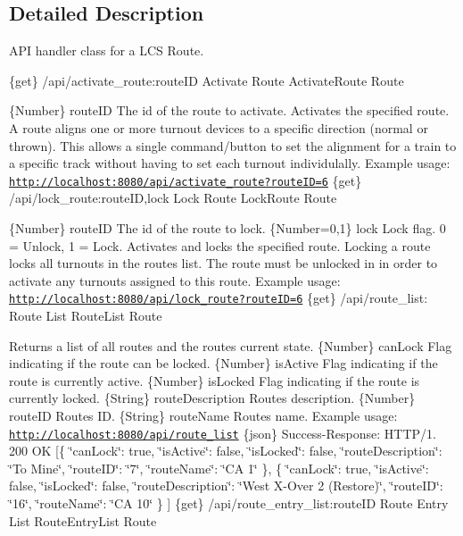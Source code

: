 \subsection{Detailed Description}
A\+PI handler class for a L\+CS Route. 

\{get\} /api/activate\+\_\+route\+:route\+ID Activate Route  Activate\+Route  Route

\{Number\} route\+ID The id of the route to activate.  Activates the specified route. A route aligns one or more turnout devices to a specific direction (normal or thrown). This allows a single command/button to set the alignment for a train to a specific track without having to set each turnout individulally.  Example usage\+: \href{http://localhost:8080/api/activate_route?routeID=6}{\tt http\+://localhost\+:8080/api/activate\+\_\+route?route\+I\+D=6}  \{get\} /api/lock\+\_\+route\+:route\+ID,lock Lock Route  Lock\+Route  Route

\{Number\} route\+ID The id of the route to lock.  \{Number=0,1\} lock Lock flag. 0 = Unlock, 1 = Lock.  Activates and locks the specified route. Locking a route locks all turnouts in the route\textquotesingle{}s list. The route must be unlocked in in order to activate any turnouts assigned to this route.  Example usage\+: \href{http://localhost:8080/api/lock_route?routeID=6}{\tt http\+://localhost\+:8080/api/lock\+\_\+route?route\+I\+D=6}  \{get\} /api/route\+\_\+list\+: Route List  Route\+List  Route

Returns a list of all routes and the routes current state.  \{Number\} can\+Lock Flag indicating if the route can be locked.  \{Number\} is\+Active Flag indicating if the route is currently active.  \{Number\} is\+Locked Flag indicating if the route is currently locked.  \{String\} route\+Description Route\textquotesingle{}s description.  \{Number\} route\+ID Route\textquotesingle{}s ID.  \{String\} route\+Name Route\textquotesingle{}s name.  Example usage\+: \href{http://localhost:8080/api/route_list}{\tt http\+://localhost\+:8080/api/route\+\_\+list}  \{json\} Success-\/\+Response\+: H\+T\+T\+P/1. 200 OK \mbox{[}\{ \char`\"{}can\+Lock\char`\"{}\+: true, \char`\"{}is\+Active\char`\"{}\+: false, \char`\"{}is\+Locked\char`\"{}\+: false, \char`\"{}route\+Description\char`\"{}\+: \char`\"{}\+To Mine\char`\"{}, \char`\"{}route\+I\+D\char`\"{}\+: \char`\"{}7\char`\"{}, \char`\"{}route\+Name\char`\"{}\+: \char`\"{}\+C\+A 1\char`\"{} \}, \{ \char`\"{}can\+Lock\char`\"{}\+: true, \char`\"{}is\+Active\char`\"{}\+: false, \char`\"{}is\+Locked\char`\"{}\+: false, \char`\"{}route\+Description\char`\"{}\+: \char`\"{}\+West X-\/\+Over 2 (\+Restore)\char`\"{}, \char`\"{}route\+I\+D\char`\"{}\+: \char`\"{}16\char`\"{}, \char`\"{}route\+Name\char`\"{}\+: \char`\"{}\+C\+A 10\char`\"{} \} \mbox{]}  \{get\} /api/route\+\_\+entry\+\_\+list\+:route\+ID Route Entry List  Route\+Entry\+List  Route

